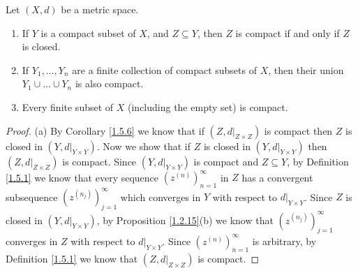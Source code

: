 \begin{theorem}\label{1.5.10}
    Let \((X, d)\) be a metric space.
    \begin{enumerate}
        \item If \(Y\) is a compact subset of \(X\), and \(Z \subseteq Y\), then \(Z\) is compact if and only if \(Z\) is closed.
        \item If \(Y_1, \dots, Y_n\) are a finite collection of compact subsets of \(X\), then their union \(Y_1 \cup \dots \cup Y_n\) is also compact.
        \item Every finite subset of \(X\) (including the empty set) is compact.
    \end{enumerate}
\end{theorem}

\begin{proof}{(a)}
    By Corollary \ref{1.5.6} we know that if \((Z, d|_{Z \times Z})\) is compact then \(Z\) is closed in \((Y, d|_{Y \times Y})\).
    Now we show that if \(Z\) is closed in \((Y, d|_{Y \times Y})\) then \((Z, d|_{Z \times Z})\) is compact.
    Since \((Y, d|_{Y \times Y})\) is compact and \(Z \subseteq Y\), by Definition \ref{1.5.1} we know that every sequence \((z^{(n)})_{n = 1}^\infty\) in \(Z\) has a convergent subsequence \((z^{(n_j)})_{j = 1}^\infty\) which converges in \(Y\) with respect to \(d|_{Y \times Y}\).
    Since \(Z\) is closed in \((Y, d|_{Y \times Y})\), by Proposition \ref{1.2.15}(b) we know that \((z^{(n_j)})_{j = 1}^\infty\) converges in \(Z\) with respect to \(d|_{Y \times Y}\).
    Since \((z^{(n)})_{n = 1}^\infty\) is arbitrary, by Definition \ref{1.5.1} we know that \((Z, d|_{Z \times Z})\) is compact.
\end{proof}


